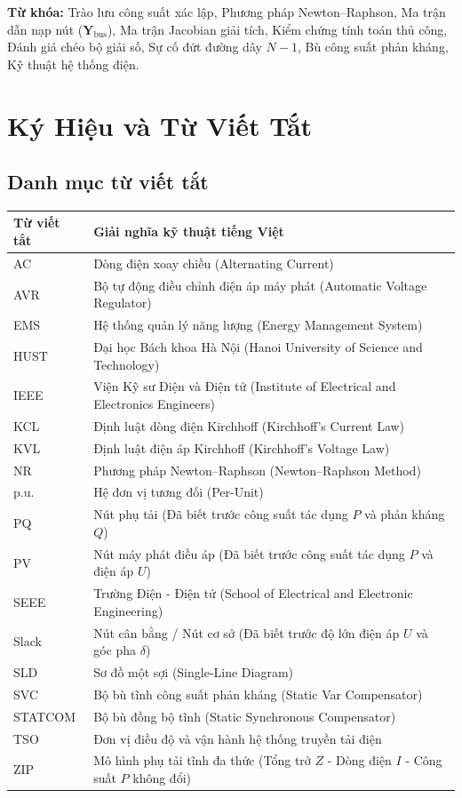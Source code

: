 \documentclass[12pt,a4paper,oneside]{report}
\begin{document}
\vspace{15pt}
\noindent \textbf{Từ khóa:} Trào lưu công suất xác lập, Phương pháp Newton--Raphson, Ma trận dẫn nạp nút ($\mathbf{Y}_{\text{bus}}$), Ma trận Jacobian giải tích, Kiểm chứng tính toán thủ công, Đánh giá chéo bộ giải số, Sự cố đứt đường dây $N-1$, Bù công suất phản kháng, Kỹ thuật hệ thống điện.

\clearpage

\chapter*{Ký Hiệu và Từ Viết Tắt}

\section*{Danh mục từ viết tắt}
\begin{longtable}{p{2.5cm}p{12.0cm}}
\toprule
\textbf{Từ viết tắt} & \textbf{Giải nghĩa kỹ thuật tiếng Việt} \\
\midrule
AC & Dòng điện xoay chiều (Alternating Current) \\
AVR & Bộ tự động điều chỉnh điện áp máy phát (Automatic Voltage Regulator) \\
EMS & Hệ thống quản lý năng lượng (Energy Management System) \\
HUST & Đại học Bách khoa Hà Nội (Hanoi University of Science and Technology) \\
IEEE & Viện Kỹ sư Điện và Điện tử (Institute of Electrical and Electronics Engineers) \\
KCL & Định luật dòng điện Kirchhoff (Kirchhoff's Current Law) \\
KVL & Định luật điện áp Kirchhoff (Kirchhoff's Voltage Law) \\
NR & Phương pháp Newton--Raphson (Newton--Raphson Method) \\
p.u. & Hệ đơn vị tương đối (Per-Unit) \\
PQ & Nút phụ tải (Đã biết trước công suất tác dụng $P$ và phản kháng $Q$) \\
PV & Nút máy phát điều áp (Đã biết trước công suất tác dụng $P$ và điện áp $U$) \\
SEEE & Trường Điện - Điện tử (School of Electrical and Electronic Engineering) \\
Slack & Nút cân bằng / Nút cơ sở (Đã biết trước độ lớn điện áp $U$ và góc pha $\delta$) \\
SLD & Sơ đồ một sợi (Single-Line Diagram) \\
SVC & Bộ bù tĩnh công suất phản kháng (Static Var Compensator) \\
STATCOM & Bộ bù đồng bộ tĩnh (Static Synchronous Compensator) \\
TSO & Đơn vị điều độ và vận hành hệ thống truyền tải điện \\
ZIP & Mô hình phụ tải tĩnh đa thức (Tổng trở $Z$ - Dòng điện $I$ - Công suất $P$ không đổi) \\
\bottomrule
\end{longtable}
\end{document}
